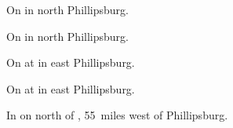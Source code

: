 
\begin{LocationList}

On  in north Phillipsburg.

On  in north Phillipsburg.

On  at  in east Phillipsburg.

\Location{\GasStation \Gas \Rest}
On  at  in east Phillipsburg.

In  on  north of , 55~miles west of Phillipsburg.

\end{LocationList}

